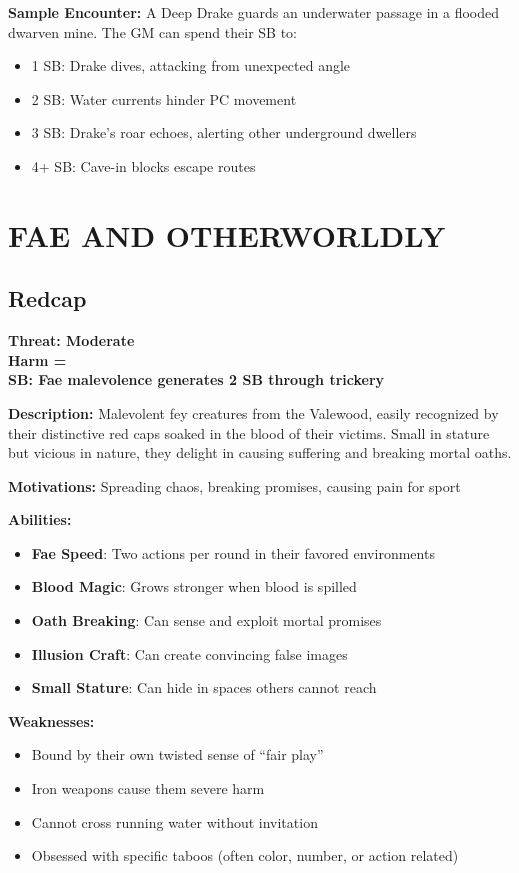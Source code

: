 \documentclass[12pt]{article}
\newcommand{\cp}[1]{\textbf{SB: #1}}
\newcommand{\harm}[1]{\textbf{Harm #1}}
\newcommand{\threat}[1]{\textbf{Threat: #1}}
\begin{document}
\textbf{Sample Encounter:}
A Deep Drake guards an underwater passage in a flooded dwarven mine. The GM can spend their SB to:
\begin{itemize}
\item 1 SB: Drake dives, attacking from unexpected angle
\item 2 SB: Water currents hinder PC movement
\item 3 SB: Drake's roar echoes, alerting other underground dwellers
\item 4+ SB: Cave-in blocks escape routes
\end{itemize}

\section{FAE AND OTHERWORLDLY}

\subsection*{Redcap}

\threat{Moderate} \\
\harm{=} \\
\cp{Fae malevolence generates 2 SB through trickery}

\vspace{0.5em}
\textbf{Description:} Malevolent fey creatures from the Valewood, easily recognized by their distinctive red caps soaked in the blood of their victims. Small in stature but vicious in nature, they delight in causing suffering and breaking mortal oaths.

\textbf{Motivations:} Spreading chaos, breaking promises, causing pain for sport

\textbf{Abilities:}
\begin{itemize}
\item \textbf{Fae Speed}: Two actions per round in their favored environments
\item \textbf{Blood Magic}: Grows stronger when blood is spilled
\item \textbf{Oath Breaking}: Can sense and exploit mortal promises
\item \textbf{Illusion Craft}: Can create convincing false images
\item \textbf{Small Stature}: Can hide in spaces others cannot reach
\end{itemize}

\textbf{Weaknesses:}
\begin{itemize}
\item Bound by their own twisted sense of ``fair play''
\item Iron weapons cause them severe harm
\item Cannot cross running water without invitation
\item Obsessed with specific taboos (often color, number, or action related)
\end{itemize}
\end{document}
